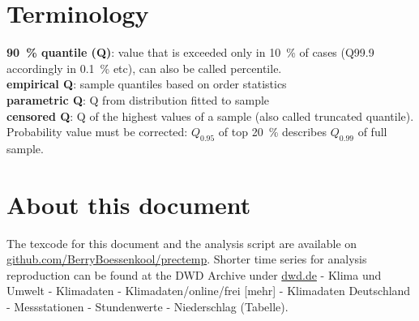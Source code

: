 \documentclass[a4paper]{article}
\newcommand{\todo}[1]{\emph{\textcolor{red}{#1}}}
\begin{document}
\begin{multicols}{2}
\section*{Terminology}

\textbf{90~\% quantile (Q)}: value that is exceeded only in 10~\% of cases (Q99.9 accordingly in 0.1~\% etc), can also be called percentile.\\
\textbf{empirical Q}:  sample quantiles based on order statistics\\
\textbf{parametric Q}: Q from distribution fitted to sample\\
\textbf{censored Q}: Q of the highest values of a sample (also called truncated quantile). Probability value must be corrected: $Q_{0.95}$ of top 20~\% describes $Q_{0.99}$ of full sample.

\section*{About this document}
The texcode for this document and the analysis script are available on \href{https://github.com/BerryBoessenkool/prectemp}{github.com/BerryBoessenkool/prectemp}.
Shorter time series for analysis reproduction can be found at the DWD Archive under
\href{http://www.dwd.de}{dwd.de} - Klima und Umwelt - Klimadaten - Klimadaten/online/frei [mehr] - Klimadaten Deutschland - Messstationen - Stundenwerte - Niederschlag (Tabelle).




\end{multicols}
\end{document}
